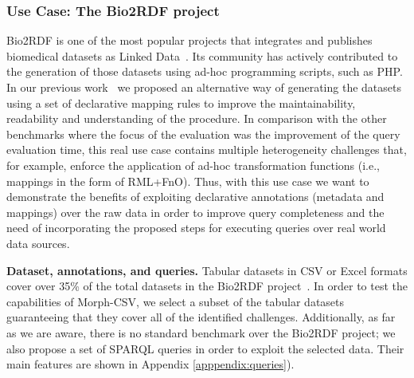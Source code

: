 \subsubsection{Use Case: The Bio2RDF project}
Bio2RDF is one of the most popular projects that integrates and publishes biomedical datasets as Linked Data~\citep{belleau2008bio2rdf}. Its community has actively contributed to the generation of those datasets using ad-hoc programming scripts, such as PHP. In our previous work~\citep{iglesias2019enhancing} we proposed an alternative way of generating the datasets using a set of declarative mapping rules to improve the maintainability, readability and understanding of the procedure. In comparison with the other benchmarks where the focus of the evaluation was the improvement of the query evaluation time, this real use case contains multiple heterogeneity challenges that, for example, enforce the application of ad-hoc transformation functions (i.e., mappings in the form of RML+FnO). Thus, with this use case we want to demonstrate the benefits of exploiting declarative annotations (metadata and mappings) over the raw data in order to improve query completeness and the need of incorporating the proposed steps for executing queries over real world data sources.

\noindent\textbf{Dataset, annotations, and queries.} Tabular datasets in  CSV or Excel formats cover over 35\% of the total datasets in the Bio2RDF project~\citep{iglesias2019enhancing}. In order to test the capabilities of Morph-CSV, we select a subset of the tabular datasets guaranteeing that they cover all of the identified challenges. Additionally, as far as we are aware, there is no standard benchmark over the Bio2RDF project; we also propose a set of SPARQL queries in order to exploit the selected data. Their main features are shown in Appendix \ref{apppendix:queries}). 


